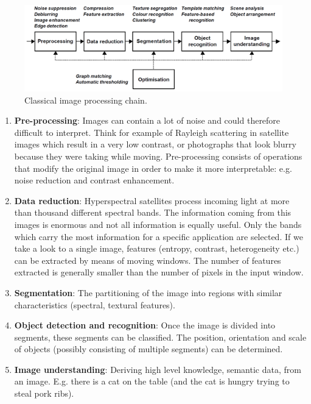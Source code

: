 \begin{figure}[h!]
	\centering
	\includegraphics[width=\textwidth]{../figures/imageProcessingChain}
	\caption{Classical image processing chain.  \citep{Egmont-Petersen2002} 
		\label{fig:imProChain}}
\end{figure}

\begin{enumerate}
	\item \textbf{Pre-processing}:
	Images can contain a lot of noise and could therefore difficult to interpret. Think for example of Rayleigh scattering in satellite images which result in a very low contrast, or photographs that look blurry because they were taking while moving. Pre-processing consists of operations that modify the original image in order to make it more interpretable: e.g. noise reduction and contrast enhancement.
	
	
	\item \textbf{Data reduction}:
Hyperspectral satellites process incoming light at more than thousand different spectral bands. The information coming from this images is enormous and not all information is equally useful. Only the bands which carry the most information for a specific application are selected. If we take a look to a single image, features (entropy, contrast, heterogeneity etc.)  can be extracted by means of moving windows. The number of features extracted is generally smaller than the number of pixels in the input window. 

\item \textbf{Segmentation}:
The partitioning of the image into regions with similar characteristics (spectral, textural features). 

\item \textbf{Object detection and recognition}:
Once the image is divided into segments, these segments can be classified. The position, orientation and scale of objects (possibly consisting of multiple segments) can be determined. 

\item \textbf{Image understanding}:
Deriving high level knowledge, semantic data, from an image. E.g. there is a cat on the table (and the cat is hungry trying to steal pork ribs).

\end{enumerate}

